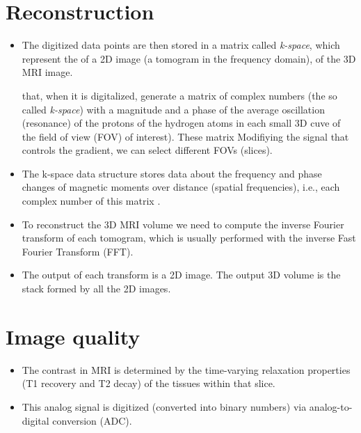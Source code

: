 \section{Reconstruction}
\begin{itemize}
\item The digitized data points are then stored in a matrix called
  \emph{k-space}, which represent the  of a 2D image (a
  tomogram in the frequency domain), of the 3D MRI image.

   that, when it is digitalized, generate a matrix of
complex numbers (the so called \emph{k-space}) with a magnitude and a
phase of the average oscillation (resonance) of the protons of the
hydrogen atoms in each small 3D cuve of the field of view (FOV) of
interest). These matrix  Modifiying the signal that
controls the gradient, we can select different FOVs (slices).
\item The k-space data structure stores data about the frequency and
  phase changes of magnetic moments over distance (spatial
  frequencies), i.e., each complex number of this matrix
  .
\item To reconstruct the 3D MRI volume we need to compute the inverse
  Fourier transform of each tomogram, which is usually performed with the
  inverse Fast Fourier Transform (FFT).
\item The output of each transform is
  a 2D image. The output 3D volume is the stack formed by all the 2D
  images.
\end{itemize}


\section{Image quality}
\begin{itemize}
\item The contrast in \gls{MRI} is determined by the
  time-varying relaxation properties (T1 recovery and T2 decay) of the
  tissues within that slice.
\item This analog signal is digitized (converted
  into binary numbers) via analog-to-digital conversion (ADC). 
\end{itemize}

